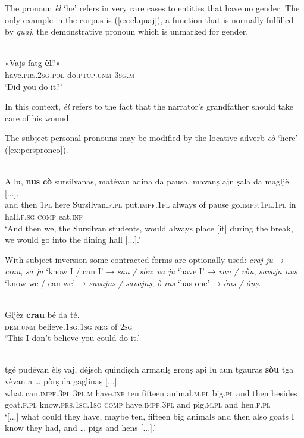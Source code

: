 The pronoun \textit{èl} `he' refers in very rare cases to entities that have no gender. The only example in the corpus is (\ref{ex:el.quaj}), a function that is normally fulfilled by \textit{quaj}, the demonstrative pronoun which is unmarked for gender.

\ea
\label{ex:el.quaj}
\\
\gll «Vajs fatg \textbf{èl}?»\\
have.\textsc{prs.2sg.pol} do.\textsc{ptcp.unm} \textsc{3sg.m}\\
\glt `Did you do it?'
\z

In this context, \textit{èl} refers to the fact that the narrator's grandfather should take care of his wound.

The subject personal pronouns may be modified by the locative adverb \textit{cò} `here' (\ref{ex:perspronco}).

\ea
\label{ex:perspronco}
\\
\gll A lu, \textbf{nus} \textbf{cò} sursilvanas, matévan adina da pausa, mavanṣ ajn ṣala da magljè [...].\\
and then \textsc{1pl} here Sursilvan.\textsc{f.pl} put.\textsc{impf.1pl} always of pause go.\textsc{impf.1pl.1pl} in hall.\textsc{f.sg} \textsc{comp} eat.\textsc{inf}\\
\glt `And then we, the Sursilvan students, would always place [it] during the break, we would go into the dining hall [...].'
\z

With subject inversion some contracted forms are optionally used: \textit{craj ju} → \textit{crau}, \textit{sa ju} `know I / can I' → \textit{sau / sòu}; \textit{va ju} `have I' → \textit{vau / vòu}, \textit{savajn nus} `know we / can we' → \textit{savajns / savajnṣ}; \textit{ò ins} `has one' → \textit{òns / ònṣ}.

\ea

\\
\gll Gljèz \textbf{crau} bé da té.\\
\textsc{dem.unm} believe.\textsc{1sg.1sg} \textsc{neg} of \textsc{2sg}\\
\glt `This I don't believe you could do it.'
\z

\ea

\\
\gll   [...] tgé pudévan èlṣ vaj, déjsch quindiṣch armaulṣ gronṣ api lu aun tgauras \textbf{sòu} tga vèvan a … pòrṣ da gaglinaṣ [...]. \\
{} what can.\textsc{impf.3pl} \textsc{3pl.m} have.\textsc{inf} ten fifteen animal.\textsc{m.pl} big.\textsc{pl} and then besides goat.\textsc{f.pl} know.\textsc{prs.1sg.1sg} \textsc{comp} have.\textsc{impf.3pl} and pig.\textsc{m.pl} and hen.\textsc{f.pl}\\
\glt `[...] what could they have, maybe ten, fifteen big animals and then also goats I know they had, and … pigs and hens [...].'
\z

